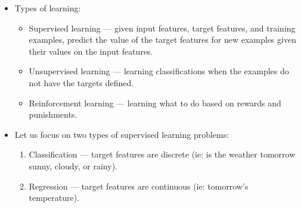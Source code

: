 \documentclass{article}
\begin{document}
\begin{itemize}
\begin{itemize}
        \end{itemize}
    \item Types of learning:
        \begin{itemize}
            \item Supervised learning --- given input features, target features, and training examples, predict the value of the target features for new examples given their values on the input features.
            \item Unsupervised learning --- learning classifications when the examples do not have the targets defined.
            \item Reinforcement learning --- learning what to do based on rewards and punishments.
        \end{itemize}
    \item Let us focus on two types of supervised learning problems:
        \begin{enumerate}
            \item Classification --- target features are discrete (ie: is the weather tomorrow sunny, cloudy, or rainy).
            \item Regression --- target features are continuous (ie: tomorrow's temperature).
        \end{enumerate}
\end{itemize}
\end{document}
